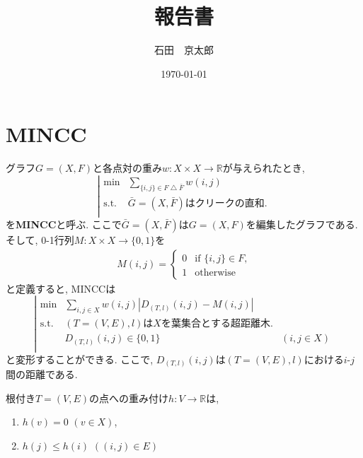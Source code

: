 \documentclass[a4paper,dvipdfmx]{jsarticle}
\title{報告書}
\author{石田　京太郎}
\date{\today}
\begin{document}
\maketitle
%
%

\section{MINCC}
グラフ$G = (X, F)$と各点対の重み$w : X \times X \rightarrow \mathbb R$が与えられたとき, 
\begin{equation}\label{eq:q_ultram}
\left|\begin{array}{rl}
\min & \displaystyle\sum_{\{i, j\} \in F \bigtriangleup \bar F} w(i,j)\\
\mbox{s.t.} & \bar G = (X, \bar F)はクリークの直和. \\
\end{array}
\right.
\end{equation}
を{\bf MINCC}と呼ぶ. ここで$\bar G = (X, \bar F)$は$G = (X, F)$を編集したグラフである. そして, 0-1行列$M  : X \times X \rightarrow \{0, 1\}$を
\begin{align}
M(i,j)=
\begin{cases}
0 &\text{if $\{i, j\} \in F$,}\\
1 &\text{otherwise}
\end{cases}
\end{align}
と定義すると, MINCCは
\begin{equation}\label{eq:q_ultram2}
\left|\begin{array}{rll}
\min & \displaystyle\sum_{i, j \in X} w(i,j)|D_{(T, l)}(i,j)- M(i,j)| & \\
\mbox{s.t.} & (T = (V, E), l)はXを葉集合とする超距離木. & \\
& D_{(T, l)}(i,j) \in \{0,1\} &(i, j \in X) \\
\end{array}
\right.
\end{equation}
と変形することができる. ここで, $D_{(T, l)}(i, j)$は$(T = (V, E), l)$における$i$-$j$間の距離である. 
\par 根付き$T = (V, E)$の点への重み付け$h: V \rightarrow \mathbb R$は, 
\begin{enumerate}
  \item $h(v) = 0$ \quad $(v \in X)$, 
  \item $h(j) \leq h(i)$ \quad $((i, j) \in E)$
\end{enumerate}
\end{document}

